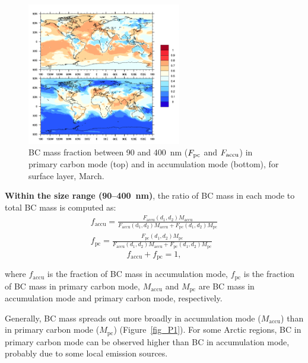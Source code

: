 \documentclass[11pt]{article}
\begin{document}
	\begin{figure}[!h] 
		\begin{center}
			\includegraphics[width = 0.6\textwidth]{Rplot02}
			\caption[]{\label{fig_P2} BC mass fraction between 90 and 400~nm ($F_{\rm pc}$ and $F_{\rm accu}$) in primary carbon mode (top) and in accumulation mode (bottom), for surface layer, March.}
		\end{center}
	\end{figure}
	
	
	\textbf{Within the size range (90--400~nm)}, the ratio of BC mass in each mode to total BC mass is computed as:
	\begin{align*}
	f_{\text{accu}} = \frac{F_{\text{accu}}(d_{1}, d_{2})M_{\text{accu}}}{F_{\text{accu}}(\text{d}_{1}, d_{2})M_{\text{accu}}+F_{\text{pc}}(d_{1}, d_{2})M_{\text{pc}}}\\
	f_{\text{pc}} = \frac{F_{\text{pc}}(d_{1}, d_{2})M_{\text{pc}}}{F_{\text{accu}}(d_{1}, d_{2})M_{\text{accu}}+F_{\text{pc}}(d_{1}, d_{2})M_{\text{pc}}}
	\end{align*}
	\[f_{\text{accu}} + f_{\text{pc}} = 1,\]
	
	where $f_{\text{accu}}$ is the fraction of BC mass in
	accumulation mode, $f_{\text{pc}}$ is the fraction of BC mass in
	primary carbon mode, $M_{\text{accu}}$ and $M_{\text{pc}}$ are BC mass
	in accumulation mode and primary carbon mode, respectively.
	
	Generally, BC mass spreads out more broadly in accumulation mode ($M_{\text{accu}}$) than in primary carbon mode ($M_{\text{pc}}$) (Figure~\ref{fig_P1}). For some Arctic regions, BC in primary carbon mode can be observed higher than BC in accumulation mode, probably due to some local emission sources.
	
\end{document}

